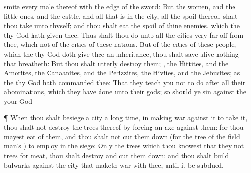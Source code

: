 {smite every
male thereof with the
edge of the
sword:
But the
women, and the little
ones, and the
cattle, and all that is in the
city,
{} all the
spoil thereof, shalt thou
take unto thyself; and thou shalt
eat the
spoil of thine
enemies, which the
{} thy
God hath
given thee.
Thus shalt thou
do unto all the
cities
{}
very far
off from thee,
which
{} not of the
cities of these
nations.
But of the
cities of these
people, which the
{} thy
God doth
give thee
{} an
inheritance, thou shalt save
alive nothing that
breatheth:
But thou shalt
utterly
destroy them;
{}, the
Hittites, and the
Amorites, the
Canaanites, and the
Perizzites, the
Hivites, and the
Jebusites; as the
{} thy
God hath
commanded thee:
That they
teach you not to
do after all their
abominations, which they have
done unto their
gods; so should ye
sin against the
{} your
God.
\par }{\PP {}¶ When thou shalt
besiege a
city a
long
time, in making
war against it to
take it, thou shalt not
destroy the
trees thereof by
forcing an
axe against them: for thou mayest
eat of them, and thou shalt not cut them
down (for the
tree of the
field
{}
man’s
{}) to
employ
{} in the
siege:
Only the
trees which thou
knowest that they
{} not
trees for
meat, thou shalt
destroy and cut them
down; and thou shalt
build
bulwarks against the
city that
maketh
war with thee, until it be
subdued.

}
